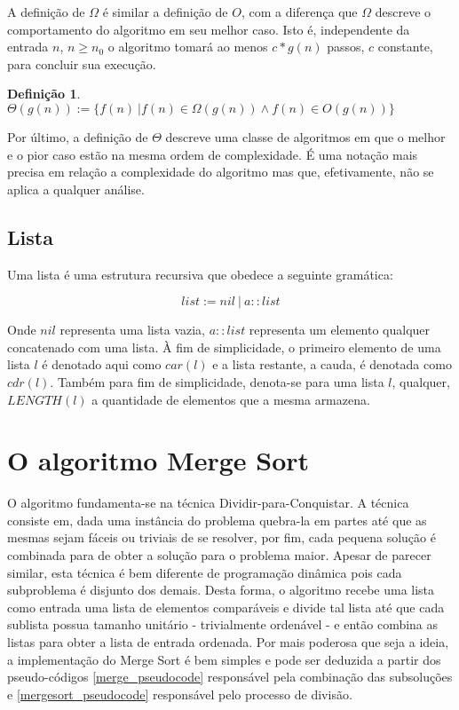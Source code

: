 \documentclass[12pt]{article}
\theoremstyle{definition}
\newtheorem{definition}{Definição}[section]
\begin{document}
A definição de $\Omega$ é similar a definição de $O$, com a diferença que $\Omega$ descreve o comportamento do algoritmo
em seu melhor caso. Isto é, independente da entrada $n$, $n \geq n_0$ o algoritmo tomará ao menos $c * g(n)$ passos, $c$ constante, para concluir
sua execução.

\theoremstyle{definition}
\begin{definition}
        $\Theta(g(n)) := \{f(n)\ | f(n) \in \Omega(g(n)) \wedge f(n) \in O(g(n))\}$        
\end{definition}

Por último, a definição de $\Theta$ descreve uma classe de algoritmos em que o melhor e o pior caso estão na mesma ordem
de complexidade. É uma notação mais precisa em relação a complexidade do algoritmo mas que, efetivamente, não se aplica
a qualquer análise.

\subsection{Lista}

Uma lista é uma estrutura recursiva que obedece a seguinte gramática:

\[list := nil\ |\ a::list\]

Onde $nil$ representa uma lista vazia, $a::list$ representa um elemento qualquer concatenado com uma lista.
À fim de simplicidade, o primeiro elemento de uma lista $l$ é denotado aqui como $car(l)$ e a lista restante,
a cauda, é denotada como $cdr(l)$. Também para fim de simplicidade, denota-se para uma lista $l$, qualquer, $LENGTH(l)$ 
a quantidade de elementos que a mesma armazena. 

\section{O algoritmo Merge Sort}
\label{merge_sort}

O algoritmo fundamenta-se na técnica Dividir-para-Conquistar. A técnica consiste em, dada uma instância do problema
quebra-la em partes até que as mesmas sejam fáceis ou triviais de se resolver, por fim, cada pequena solução é combinada para
de obter a solução para o problema maior. Apesar de parecer similar, esta técnica é bem diferente de programação dinâmica pois
cada subproblema é disjunto dos demais. Desta forma, o algoritmo recebe uma lista como entrada uma lista de elementos comparáveis
e divide tal lista até que cada sublista possua tamanho unitário - trivialmente ordenável - e então combina as listas para obter
a lista de entrada ordenada. Por mais poderosa que seja a ideia, a implementação do Merge Sort é bem simples e pode ser deduzida
a partir dos pseudo-códigos \ref{merge_pseudocode} responsável pela combinação das subsoluções e \ref{mergesort_pseudocode} responsável pelo processo de
divisão.
\end{document}
